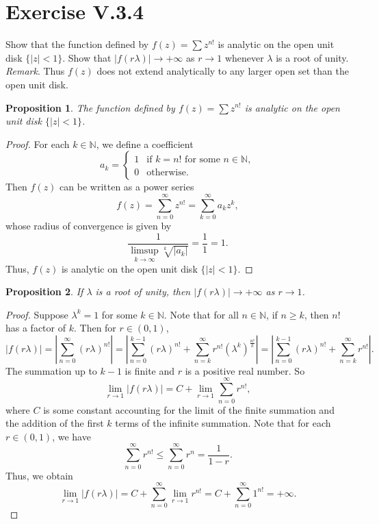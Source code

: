 \documentclass[12pt]{article}
\newenvironment{problem}
    {\begin{lrbox}{\mybox}\begin{minipage}{0.98\textwidth}}
    {\end{minipage}\end{lrbox}\framebox[\textwidth]{\usebox{\mybox}}}
\newtheorem{proposition}{Proposition}
\newcommand{\N}{\mathbb{N}}
\begin{document}
\newpage
\section{Exercise V.3.4}
\begin{problem}
    Show that the function defined by $f(z) = \sum z^{n!}$ is analytic on the open unit disk $\{|z| < 1\}$. Show that $|f(r \lambda)| \to +\infty$ as $r \to 1$ whenever $\lambda$ is a root of unity. \emph{Remark}. Thus $f(z)$ does not extend analytically to any larger open set than the open unit disk.
\end{problem}

\begin{proposition}
    The function defined by $f(z) = \sum z^{n!}$ is analytic on the open unit disk $\{|z| < 1\}$.
\end{proposition}

\begin{proof}
    For each $k \in \N$, we define a coefficient
    \[
        a_k = \begin{cases}
            1 & \text{if $k = n!$ for some $n \in \N$}, \\
            0 & \text{otherwise}.
        \end{cases}
    \]
    Then $f(z)$ can be written as a power series
    \[
        f(z) = \sum_{n = 0}^\infty z^{n!} = \sum_{k = 0}^\infty a_k z^k,
    \]
    whose radius of convergence is given by
    \[
        \frac{1}{\limsup\limits_{k \to \infty} \sqrt[k]{|a_k|}} = \frac{1}{1} = 1.
    \]
    Thus, $f(z)$ is analytic on the open unit disk $\{|z| < 1\}$.
    
\end{proof}

\begin{proposition}
    If $\lambda$ is a root of unity, then $|f(r \lambda)| \to +\infty$ as $r \to 1$.
\end{proposition}

\begin{proof}
    Suppose $\lambda^k = 1$ for some $k \in \N$. Note that for all $n \in \N$, if $n \geq k$, then $n!$ has a factor of $k$. Then for $r \in (0, 1)$,
    \[
        |f(r\lambda)| = \left| \sum_{n = 0}^\infty (r\lambda)^{n!} \right|
            = \left| \sum_{n = 0}^{k-1} (r\lambda)^{n!} + \sum_{n = k}^\infty r^{n!}(\lambda^k)^{\frac{n!}{k}} \right|
            = \left| \sum_{n = 0}^{k-1} (r\lambda)^{n!} + \sum_{n = k}^\infty r^{n!} \right|.
    \]
    The summation up to $k - 1$ is finite and $r$ is a positive real number. So
    \[
        \lim_{r \to 1} |f(r\lambda)| = C + \lim_{r \to 1} \sum_{n = 0}^\infty r^{n!},
    \]
    where $C$ is some constant accounting for the limit of the finite summation and the addition of the first $k$ terms of the infinite summation. Note that for each $r \in (0, 1)$, we have
    \[
        \sum_{n = 0}^\infty r^{n!} \leq \sum_{n = 0}^\infty r^n = \frac{1}{1 - r}.
    \]
    Thus, we obtain
    \[
        \lim_{r \to 1} |f(r\lambda)| 
            = C + \sum_{n = 0}^\infty \lim_{r \to 1} r^{n!} 
            = C + \sum_{n = 0}^\infty 1^{n!}
            = +\infty.
    \]
    
\end{proof}
\end{document}
